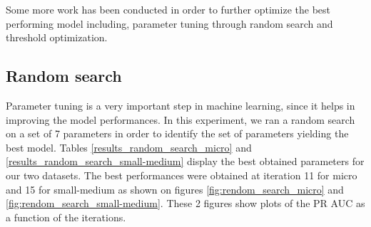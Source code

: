 \documentclass[LaM,binding=0.6cm, english]{sapthesis}
\begin{document}
\begin{table}[!ht]
\centering
{}
\vspace{2mm}
\caption{Results summary (Small-medium)}
\label{results_summary_small-medium}
\end{table}

Some more work has been conducted in order to further optimize the best performing model including, parameter tuning through random search and threshold optimization. 

\subsection{Random search}

Parameter tuning is a very important step in machine learning, since it helps in improving the model performances. In this experiment, we ran a random search on a set of 7 parameters in order to identify the set of parameters yielding the best model. Tables \ref{results_random_search_micro} and \ref{results_random_search_small-medium} display the best obtained parameters for our two datasets. The best performances were obtained at iteration 11 for micro and 15 for small-medium as shown on figures \ref{fig:rendom_search_micro} and \ref{fig:rendom_search_small-medium}. These 2 figures show plots of the PR AUC as a function of the iterations.
\end{document}
